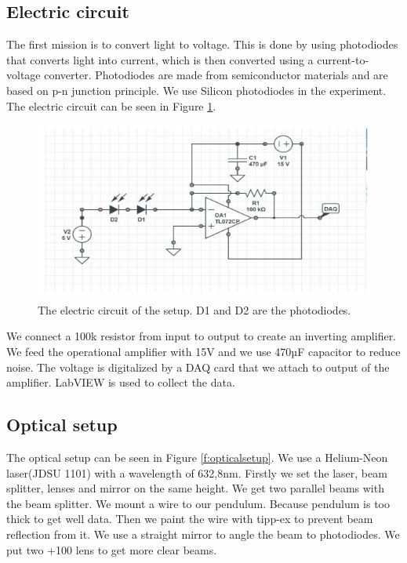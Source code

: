 ﻿\documentclass[11pt, a4paper]{article}
\begin{document}
\subsection{Electric circuit}
\label{s:Electric circuit}
The first mission is to convert light to voltage. This is done by using photodiodes 
that converts light into current, which is then converted using a
current-to-voltage converter.
Photodiodes are made from semiconductor materials and are based on p-n junction 
principle. We use Silicon photodiodes in the experiment. The electric circuit can 
be seen in Figure \ref{f:circuit}.
\begin{figure}[h]
	\centering
	\includegraphics{circuit}
	\caption{The electric circuit of the setup. D1 and D2 are the photodiodes.}
	\label{f:circuit}
\end{figure}

We connect a 100k resistor from input to output to create an inverting amplifier. 
We feed the operational amplifier with 15V and we use 470µF capacitor to reduce 
noise. The voltage is digitalized by a DAQ card that we attach to output of the 
amplifier. LabVIEW is used to collect the data.

\subsection{Optical setup}
\label{s:Optical setup}
The optical setup can be seen in Figure \ref{f:opticalsetup}. We use a Helium-Neon 
laser(JDSU 1101) with a wavelength of 632,8nm. Firstly we set the laser, beam 
splitter, lenses and mirror on the same height. We get two parallel beams with the 
beam splitter. 
We mount a wire to our pendulum. Because pendulum is too thick to get well data. 
Then we paint the wire with tipp-ex to prevent beam reflection from it. We use a 
straight mirror to angle the beam to photodiodes. We put two +100 lens to get more 
clear beams.
\end{document}
